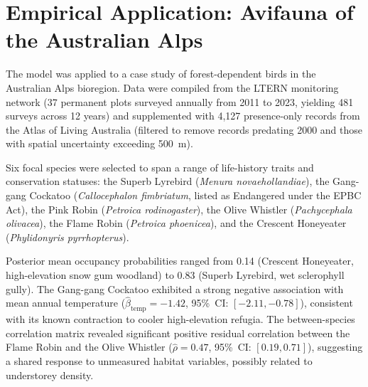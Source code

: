 \section{Empirical Application: Avifauna of the Australian Alps}

The model was applied to a case study of forest-dependent birds in the
Australian Alps bioregion. Data were compiled from the LTERN monitoring network
(37 permanent plots surveyed annually from 2011 to 2023, yielding 481 surveys
across 12 years) and supplemented with 4{,}127 presence-only records from the
Atlas of Living Australia (filtered to remove records predating 2000 and those
with spatial uncertainty exceeding 500~m).

Six focal species were selected to span a range of life-history traits and
conservation statuses: the Superb Lyrebird (\textit{Menura novaehollandiae}),
the Gang-gang Cockatoo (\textit{Callocephalon fimbriatum}, listed as Endangered
under the EPBC Act), the Pink Robin (\textit{Petroica rodinogaster}), the
Olive Whistler (\textit{Pachycephala olivacea}), the Flame Robin
(\textit{Petroica phoenicea}), and the Crescent Honeyeater
(\textit{Phylidonyris pyrrhopterus}).

Posterior mean occupancy probabilities ranged from 0.14 (Crescent Honeyeater,
high-elevation snow gum woodland) to 0.83 (Superb Lyrebird, wet sclerophyll
gully). The Gang-gang Cockatoo exhibited a strong negative association with
mean annual temperature ($\hat{\beta}_{\text{temp}} = -1.42$,
95\%~CI: $[-2.11, -0.78]$), consistent with its known contraction to
cooler high-elevation refugia. The between-species correlation matrix revealed
significant positive residual correlation between the Flame Robin and the
Olive Whistler ($\hat{\rho} = 0.47$, 95\%~CI: $[0.19, 0.71]$), suggesting a
shared response to unmeasured habitat variables, possibly related to
understorey density.
